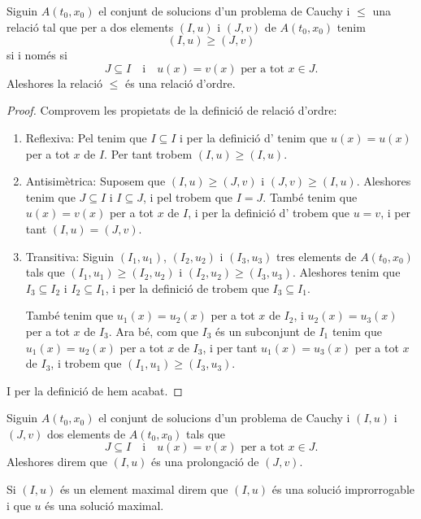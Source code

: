 \documentclass[../../Main.tex]{subfiles}
\begin{document}
	\begin{proposition}
		\label{prop:la prolongació és una relació d'ordre}
		Siguin \(A(t_{0},x_{0})\) el conjunt de solucions d'un problema de Cauchy i \(\leq\) una relació tal que per a dos elements \((I,u)\) i \((J,v)\) de \(A(t_{0},x_{0})\) tenim
		\[
		    (I,u)\geq(J,v)
		\]
		si i només si
		\[
		    J\subseteq I\quad\text{i}\quad u(x)=v(x)\text{ per a tot }x\in J.
		\]
		Aleshores la relació \(\leq\) és una relació d'ordre.
		\begin{proof}
			Comprovem les propietats de la definició de relació d'ordre:
			\begin{enumerate}
				\item Reflexiva: Pel  tenim que \(I\subseteq I\) i per la definició d' tenim que \(u(x)=u(x)\) per a tot \(x\) de \(I\).
				Per tant trobem \((I,u)\geq(I,u)\).
				
				\item Antisimètrica: Suposem que \((I,u)\geq(J,v)\) i \((J,v)\geq(I,u)\).
				Aleshores tenim que \(J\subseteq I\) i \(I\subseteq J\), i pel  trobem que \(I=J\).
				També tenim que \(u(x)=v(x)\) per a tot \(x\) de \(I\), i per la definició d' trobem que \(u=v\), i per tant \((I,u)=(J,v)\).
				
				\item Transitiva: Siguin \((I_{1},u_{1})\), \((I_{2},u_{2})\) i \((I_{3},u_{3})\) tres elements de \(A(t_{0},x_{0})\) tals que \((I_{1},u_{1})\geq(I_{2},u_{2})\) i \((I_{2},u_{2})\geq(I_{3},u_{3})\).
				Aleshores tenim que \(I_{3}\subseteq I_{2}\) i \(I_{2}\subseteq I_{1}\), i per la definició de  trobem que \(I_{3}\subseteq I_{1}\).
				
				També tenim que \(u_{1}(x)=u_{2}(x)\) per a tot \(x\) de \(I_{2}\), i \(u_{2}(x)=u_{3}(x)\) per a tot \(x\) de \(I_{3}\).
				Ara bé, com que \(I_{3}\) és un subconjunt de \(I_{1}\) tenim que \(u_{1}(x)=u_{2}(x)\) per a tot \(x\) de \(I_{3}\), i per tant \(u_{1}(x)=u_{3}(x)\) per a tot \(x\) de \(I_{3}\), i trobem que \((I_{1},u_{1})\geq(I_{3},u_{3})\).
			\end{enumerate}
			I per la definició de  hem acabat.
		\end{proof}
	\end{proposition}
	\begin{definition}[Prolongació]
		\label{def:prolongació}
		\label{def:solució improrrogable}
		\label{def:solució maximal}
		Siguin \(A(t_{0},x_{0})\) el conjunt de solucions d'un problema de Cauchy i \((I,u)\) i \((J,v)\) dos elements de \(A(t_{0},x_{0})\) tals que
		\[
		    J\subseteq I\quad\text{i}\quad u(x)=v(x)\text{ per a tot }x\in J.
		\]
		Aleshores direm que \((I,u)\) és una prolongació de \((J,v)\).
		
		Si \((I,u)\) és un element maximal direm que \((I,u)\) és una solució improrrogable i que \(u\) és una solució maximal.
	\end{definition}
\end{document}
